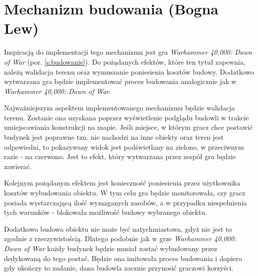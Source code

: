 \section{Mechanizm budowania (Bogna Lew)}\label{s:build_proj}
Inspiracją do implementacji tego mechanizmu jest gra \textit{Warhammer 40,000: Dawn of War} (por. \ref{s:budowanie}). Do pożądanych
efektów, które ten tytuł zapewnia, należą walidacja terenu oraz wymuszanie poniesienia kosztów budowy. Dodatkowo
wytwarzana gra będzie implementować proces budowania analogicznie jak w \textit{Warhammer 40,000: Dawn of War}.

Najważniejszym aspektem implementowanego mechanizmu będzie walidacja terenu. Zostanie ona uzyskana poprzez wyświetlenie
podglądu budowli w trakcie umiejscawiania konstrukcji na mapie. Jeśli miejsce, w którym gracz chce postawić budynek jest
poprawne tzn. nie nachodzi na inne obiekty oraz teren jest odpowiedni, to pokazywany widok jest podświetlany na zielono,
w przeciwnym razie - na czerwono. Jest to efekt, który wytwarzana przez zespół gra będzie zawierać.

Kolejnym pożądanym efektem jest konieczność poniesienia przez użytkownika kosztów
wybudowania obiektu. W tym celu gra będzie monitorowała, czy gracz posiada wystarczającą ilość wymaganych zasobów, a w
przypadku niespełnienia tych warunków - blokowała możliwość budowy wybranego obiektu.

Dodatkowo budowa obiektu nie może być natychmiastowa, gdyż nie jest to zgodnie z rzeczywistością. Dlatego podobnie jak w
grze \textit{Warhammer 40,000: Dawn of War} każdy budynek będzie musiał zostać wybudowany przez dedykowaną do tego postać. Będzie
ona imitowała proces budowania i dopiero gdy ukończy to zadanie, dana budowla zacznie przynosić graczowi korzyści.
